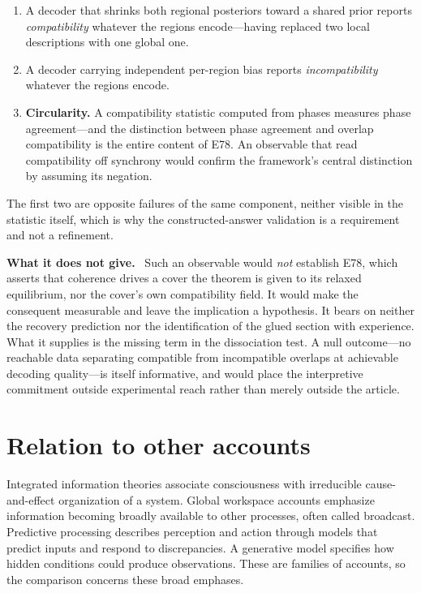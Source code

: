 \documentclass[11pt]{article}
\newcommand{\scope}{\par\smallskip\noindent\textbf{What it does not give.}\ }
\begin{document}
\begin{enumerate}[leftmargin=*]
\item A decoder that shrinks both regional posteriors toward a shared prior
reports \emph{compatibility} whatever the regions encode---having replaced two
local descriptions with one global one.
\item A decoder carrying independent per-region bias reports
\emph{incompatibility} whatever the regions encode.
\item \textbf{Circularity.} A compatibility statistic computed from phases
measures phase agreement---and the distinction between phase agreement and
overlap compatibility is the entire content of E78. An observable that read
compatibility off synchrony would confirm the framework's central distinction
by assuming its negation.
\end{enumerate}

\noindent
The first two are opposite failures of the same component, neither visible in
the statistic itself, which is why the constructed-answer validation is a
requirement and not a refinement.

\scope
Such an observable would \emph{not} establish E78, which asserts that coherence
drives a cover the theorem is given to its relaxed equilibrium, nor the cover's
own compatibility field. It would make the consequent
measurable and leave the implication a hypothesis. It bears on neither the
recovery prediction nor the identification of the glued section with
experience. What it supplies is the missing term in the dissociation test. A
null outcome---no reachable data separating compatible from incompatible
overlaps at achievable decoding quality---is itself informative, and would
place the interpretive commitment outside experimental reach rather than merely
outside the article.

\section{Relation to other accounts}

Integrated information theories associate consciousness with irreducible
cause-and-effect organization of a system. Global workspace accounts emphasize
information becoming broadly available to other processes, often called
broadcast. Predictive processing describes perception and action through models
that predict inputs and respond to discrepancies. A generative model specifies
how hidden conditions could produce observations. These are families of
accounts, so the comparison concerns these broad emphases.
\end{document}
